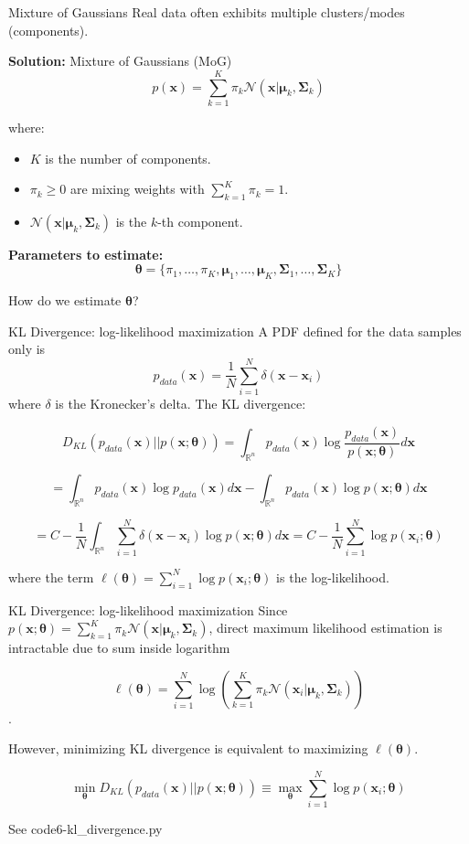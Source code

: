 \documentclass{beamer}
\newcommand{\x}{\mathbf{x}}
\newcommand{\bmu}{\boldsymbol{\mu}}
\newcommand{\bSigma}{\boldsymbol{\Sigma}}
\newcommand{\btheta}{\boldsymbol{\theta}}
\begin{document}
\begin{frame}{Mixture of Gaussians}
Real data often exhibits multiple clusters/modes (components).

\vspace{0.5cm}

\textbf{Solution:} Mixture of Gaussians (MoG)
$$p(\x) = \sum_{k=1}^K \pi_k \mathcal{N}(\x|\bmu_k, \bSigma_k)$$

where:
\begin{itemize}
\item $K$ is the number of components.
\item $\pi_k \geq 0$ are mixing weights with $\sum_{k=1}^K \pi_k = 1$.
\item $\mathcal{N}(\x|\bmu_k, \bSigma_k)$ is the $k$-th component.
\end{itemize}

\pause

\textbf{Parameters to estimate:}
$$\btheta = \{\pi_1, \ldots, \pi_K, \bmu_1, \ldots, \bmu_K, \bSigma_1, \ldots, \bSigma_K\}$$

\pause

\alert{How do we estimate $\btheta$?}

\end{frame}

\begin{frame}{KL Divergence: log-likelihood maximization}
  A PDF defined for the data samples only is
  $$p_{data}(\x) = \frac{1}{N}\sum_{i=1}^N \delta(\x - \x_i)$$ where
  $\delta$ is the Kronecker's delta. The KL divergence:
    
  $$D_{KL}(p_{data}(\x)||p(\x;\btheta)) = \int_{\mathbb{R}^n} p_{data}(\x) \log \frac{p_{data}(\x)}{p(\x;\btheta)} d\x$$

  $$ = \int_{\mathbb{R}^n} p_{data}(\x) \log p_{data}(\x) d\x - \int_{\mathbb{R}^n} p_{data}(\x) \log p(\x;\btheta) d\x$$

  $$ = C - \frac{1}{N} \int_{\mathbb{R}^n} \sum_{i=1}^N \delta(\x - \x_i)\log p(\x;\btheta) d\x = C - \frac{1}{N} \sum_{i=1}^N \log p(\x_i;\btheta)$$

  where the term $\ell(\btheta)=\sum_{i=1}^N \log p(\x_i;\btheta)$ is
  the \alert{log-likelihood}.
\end{frame}

\begin{frame}{KL Divergence: log-likelihood maximization}
  Since $p(\x;\btheta) = \sum_{k=1}^K \pi_k \mathcal{N}(\x|\bmu_k, \bSigma_k)$, direct maximum likelihood estimation is intractable due to sum inside
  logarithm
  
  $$\ell(\btheta) = \sum_{i=1}^N \log\left(\sum_{k=1}^K \pi_k \mathcal{N}(\x_i|\bmu_k, \bSigma_k)\right)$$.

  However, minimizing KL divergence is equivalent to maximizing $\ell(\btheta)$.
  
  $$\min_{\boldsymbol{\theta}} D_{KL}(p_{data}(\x)||p(\x;\boldsymbol{\theta})) \equiv \max_{\boldsymbol{\theta}} \sum_{i=1}^N \log p(\mathbf{x}_i;\boldsymbol{\theta})$$

  See code6-kl\_divergence.py
  
\end{frame}
\end{document}
